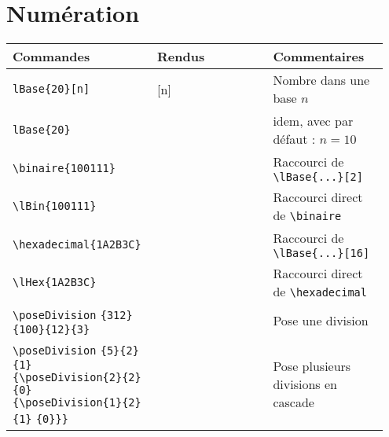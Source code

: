\documentclass[a4paper,10pt]{article}
\begin{document}
	\section{Numération}
	\noindent
	\begin{tabular}{|p{0.35\linewidth}|p{0.3\linewidth}|p{0.3\linewidth}|}
		\hline
			\textbf{Commandes}&\textbf{Rendus}&\textbf{Commentaires}
		\\\hline\hline
			\verb!lBase{20}[n]!			&	\lBase{20}[n]			&	Nombre dans une base $n$
		\\\hline
			\verb!lBase{20}!			&	\lBase{20}			&	idem, avec par défaut : $n=10$
		\\\hline
			\verb!\binaire{100111}!			&	\binaire{100111}		&	Raccourci de \verb!\lBase{...}[2]!
		\\\hline
			\verb!\lBin{100111}!			&	\lBin{100111}			&	Raccourci direct de \verb!\binaire!
		\\\hline
			\verb!\hexadecimal{1A2B3C}!		&	\hexadecimal{1A2B3C}		&	Raccourci de \verb!\lBase{...}[16]!
		\\\hline
			\verb!\lHex{1A2B3C}!			&	\lHex{1A2B3C}			&	Raccourci direct de \verb!\hexadecimal!
		\\\hline
			\verb!\poseDivision! \verb!{312}{100}{12}{3}!			&	\poseDivision{312}{100}{12}{3}			&	Pose une division
		\\\hline
			\verb!\poseDivision! \verb!{5}{2}{1}! \verb!{\poseDivision{2}{2}{0}! \verb!{\poseDivision{1}{2}{1}! \verb!{0}}}!			&	\poseDivision{5}{2}{1}{\poseDivision{2}{2}{0}{\poseDivision{1}{2}{1}{0}}}			&	Pose plusieurs divisions en cascade
		\\\hline
	\end{tabular}
\end{document}
